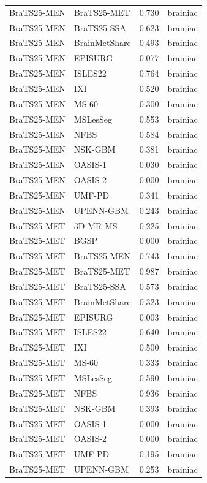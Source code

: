 \begin{tabular}{llrl}
BraTS25-MEN & BraTS25-MET & 0.730 & brainiac \\
BraTS25-MEN & BraTS25-SSA & 0.623 & brainiac \\
BraTS25-MEN & BrainMetShare & 0.493 & brainiac \\
BraTS25-MEN & EPISURG & 0.077 & brainiac \\
BraTS25-MEN & ISLES22 & 0.764 & brainiac \\
BraTS25-MEN & IXI & 0.520 & brainiac \\
BraTS25-MEN & MS-60 & 0.300 & brainiac \\
BraTS25-MEN & MSLesSeg & 0.553 & brainiac \\
BraTS25-MEN & NFBS & 0.584 & brainiac \\
BraTS25-MEN & NSK-GBM & 0.381 & brainiac \\
BraTS25-MEN & OASIS-1 & 0.030 & brainiac \\
BraTS25-MEN & OASIS-2 & 0.000 & brainiac \\
BraTS25-MEN & UMF-PD & 0.341 & brainiac \\
BraTS25-MEN & UPENN-GBM & 0.243 & brainiac \\
BraTS25-MET & 3D-MR-MS & 0.225 & brainiac \\
BraTS25-MET & BGSP & 0.000 & brainiac \\
BraTS25-MET & BraTS25-MEN & 0.743 & brainiac \\
BraTS25-MET & BraTS25-MET & 0.987 & brainiac \\
BraTS25-MET & BraTS25-SSA & 0.573 & brainiac \\
BraTS25-MET & BrainMetShare & 0.323 & brainiac \\
BraTS25-MET & EPISURG & 0.003 & brainiac \\
BraTS25-MET & ISLES22 & 0.640 & brainiac \\
BraTS25-MET & IXI & 0.500 & brainiac \\
BraTS25-MET & MS-60 & 0.333 & brainiac \\
BraTS25-MET & MSLesSeg & 0.590 & brainiac \\
BraTS25-MET & NFBS & 0.936 & brainiac \\
BraTS25-MET & NSK-GBM & 0.393 & brainiac \\
BraTS25-MET & OASIS-1 & 0.000 & brainiac \\
BraTS25-MET & OASIS-2 & 0.000 & brainiac \\
BraTS25-MET & UMF-PD & 0.195 & brainiac \\
BraTS25-MET & UPENN-GBM & 0.253 & brainiac \\

\end{tabular}
